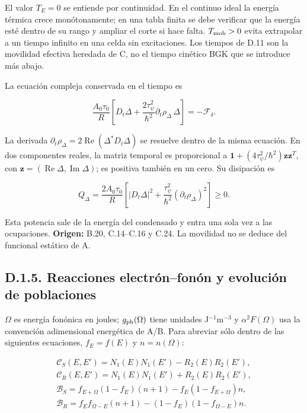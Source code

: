 \documentclass[
  spanish,
  10pt,
  a4paper,
]{article}
\begin{document}
El valor \(T_E=0\) se entiende por continuidad. En el continuo ideal la
energía térmica crece monótonamente; en una tabla finita se debe
verificar que la energía esté dentro de su rango y ampliar el corte si
hace falta. \(T_{\rm mob}>0\) evita extrapolar a un tiempo infinito en
una celda sin excitaciones. Los tiempos de D.11 son la movilidad
efectiva heredada de C, no el tiempo cinético BGK que se introduce más
abajo.

La ecuación compleja conservada en el tiempo es

\[
\frac{A_0\tau_0}{R}
\left[D_t\Delta+\frac{2\tau_\psi^2}{\hbar^2}
\partial_t\rho_\Delta\,\Delta\right]=-\mathscr F_\delta.
\tag{D.12}
\]

La derivada
\(\partial_t\rho_\Delta=2\operatorname{Re}(\Delta^*D_t\Delta)\) se
resuelve dentro de la misma ecuación. En dos componentes reales, la
matriz temporal es proporcional a
\(\mathbf1+(4\tau_\psi^2/\hbar^2)\mathbf z\mathbf z^T\), con
\(\mathbf z=(\operatorname{Re}\Delta,\operatorname{Im}\Delta)\); es
positiva también en un cero. Su disipación es

\[
Q_\Delta=\frac{2A_0\tau_0}{R}
\left[|D_t\Delta|^2+\frac{\tau_\psi^2}{\hbar^2}
(\partial_t\rho_\Delta)^2\right]\geq0.
\tag{D.13}
\]

Esta potencia sale de la energía del condensado y entra una sola vez a
las ocupaciones. \textbf{Origen:} B.20, C.14--C.16 y C.24. La movilidad
no se deduce del funcional estático de A.

\subsection{D.1.5. Reacciones electrón--fonón y evolución de
poblaciones}\label{d.1.5.-reacciones-electruxf3nfonuxf3n-y-evoluciuxf3n-de-poblaciones}

\(\Omega\) es energía fonónica en joules; \(g_{\rm ph}(\Omega)\) tiene
unidades J\(^{-1}\)m\(^{-3}\) y \(\alpha^2F(\Omega)\) usa la convención
adimensional energética de A/B. Para abreviar sólo dentro de las
siguientes ecuaciones, \(f_E=f(E)\) y \(n=n(\Omega)\):

\[
\begin{gathered}
\mathcal C_S(E,E')=N_1(E)N_1(E')-R_2(E)R_2(E'),\\
\mathcal C_R(E,E')=N_1(E)N_1(E')+R_2(E)R_2(E'),\\
\mathcal B_S=f_{E+\Omega}(1-f_E)(n+1)-f_E(1-f_{E+\Omega})n,\\
\mathcal B_R=f_Ef_{\Omega-E}(n+1)-(1-f_E)(1-f_{\Omega-E})n.
\end{gathered}\tag{D.14}
\]
\end{document}
